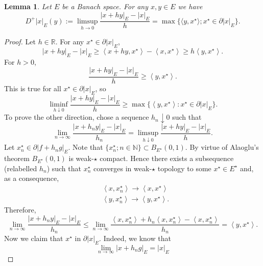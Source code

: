 \documentclass[10pt, reqno]{amsart}
\newcommand{\N}{\mathbb{N}}
\newtheorem{lem}{Lemma}
\theoremstyle{definition}
\numberwithin{lem}{section}
\numberwithin{cor}{section}
\numberwithin{prop}{section}
\numberwithin{thm}{section}
\numberwithin{dfn}{section}
\begin{document}
\begin{lem}{\cite[Equation (D.2)]{da2014stochastic}} Let $E$ be a Banach space. For any $x,y\in E$ we have
$$D^+|x|_E(y):=\limsup_{h\to 0}\frac{|x+hy|_E-|x|_E}{h}=\max\big\{\langle y, x^\star\rangle; x^\star\in\partial|x|_{E}  \big\}.          $$   
\end{lem}	
	\begin{proof}
		Let $h \in \mathbb{R}$. For any $x^\star \in \partial|x|_E$,
		\begin{equation*}
			|x+hy|_E - |x|_E \geq \left<x+hy,x^\star\right> - \left<x,x^\star \right>\geq h \left<y,x^\star\right>.
		\end{equation*}
		For $h>0$,
		\begin{equation*}
			\frac{|x + hy|_E - |x|_E}{h} \geq \left<y,x^\star\right>.
		\end{equation*}
		This is true for all $x^\star \in \partial |x|_E$, so 
		\begin{equation} \label{eq:geq-max}
			\liminf_{h \downarrow 0} \frac{|x + hy|_E - |x|_E}{h}\geq \max\{\left<y,x^\star\right>: x^\star \in \partial|x|_E\}.
		\end{equation}
		To prove the other direction, chose a sequence $h_n \downarrow 0$ such that
		\begin{equation*}
			\lim_{n \to \infty} \frac{|x + h_n y|_E - |x|_E}{h_n}  = \limsup_{h \downarrow 0} \frac{|x + hy|_E - |x|_E}{h}. 
		\end{equation*}
		Let $x_n^\star \in \partial|f + h_ng|_E$. Note that $\{x_n^\star; n\in\N\}\subset B_{E^\star}(0,1).$ By virtue of Alaoglu's theorem $B_{E^\star}(0,1)$ is  weak-$\star$ compact. Hence there exists a subsequence (relabelled $h_n$) such that
		$x_{n}^\star$ converges in weak-$\star$ topology to some $x^\star\in E^{\star}$ and, as a consequence, 
		\begin{align*}
			&\left<x,x^\star_{n} \right> \to \left<x,x^\star\right>\\
			&\left<y, x^\star_{n} \right> \to \left<y, x^\star \right>.
		\end{align*}
		Therefore, 
		\begin{equation*}
			\lim_{n \to \infty} \frac{|x+h_n y|_E - |x|_E}{h_n} \leq \lim_{n \to \infty}\frac{\left<x, x_{n}^\star\right> + h_n \left<x, x_{n}^\star\right> - \left<x, x_{n}^\star\right>}{h_n} = \left<y,x^\star\right>.
		\end{equation*}
		Now we claim that $x^\star$ in $\partial |x|_E.$ Indeed, we know that 
		\begin{equation*}
			\lim_{n \to \infty} |x + h_n g|_E = |x|_E

\end{equation*}
\end{proof}
\end{document}
